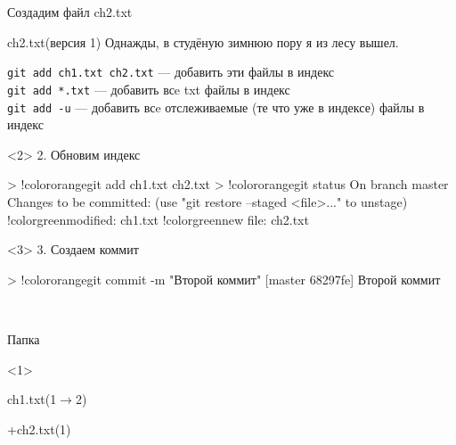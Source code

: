 \documentclass[9pt, aspectratio=1610]{beamer}
\begin{document}
\begin{frame}[fragile]
\begin{minipage}[t][\paperheight-3cm][t]{0.68\linewidth}
\begin{minipage}[t][5.2cm][t]{\linewidth}
\begin{onlyenv}
				Создадим файл ch2.txt
				\begin{block}{ch2.txt(версия 1)}
					Однажды, в студёную зимнюю пору я из лесу вышел.
				\end{block}
				
				\Verb|git add ch1.txt ch2.txt| --- добавить эти файлы в индекс\\
				\Verb|git add *.txt| --- добавить всe txt файлы в индекс\\
				\Verb|git add -u| --- добавить всe отслеживаемые (те что уже в индексе) файлы в индекс
				
			\end{onlyenv}%
			
			\begin{onlyenv}<2>
				2. Обновим индекс
				
				\begin{VerbatimCmd}[gobble=5]
					
					> !color{orange}git add ch1.txt ch2.txt
					> !color{orange}git status
					On branch master
					Changes to be committed:
					(use "git restore --staged <file>..." to unstage)
						!color{green}modified:   ch1.txt
						!color{green}new file:   ch2.txt
					
				\end{VerbatimCmd}
			\end{onlyenv}
			
			\begin{onlyenv}<3>
				3. Создаем коммит
				
				\begin{VerbatimCmd}[gobble=5]
					
					> !color{orange}git commit -m "Второй коммит"    
					[master 68297fe] Второй коммит
					
				\end{VerbatimCmd}
			\end{onlyenv}	
				
		\end{minipage}\\
		\begin{minipage}[t][3cm][t]{\linewidth}
			\begin{minipage}[t]{0.29\linewidth}
				\begin{exampleblock}{Папка\strut}  %
					
					\begin{onlyenv}<1>
						\strut ch1.txt(1$\to$2)
						
						\strut +ch2.txt(1)
					\end{onlyenv}
					

\end{exampleblock}
\end{minipage}
\end{minipage}
\end{minipage}
\end{frame}
\end{document}

